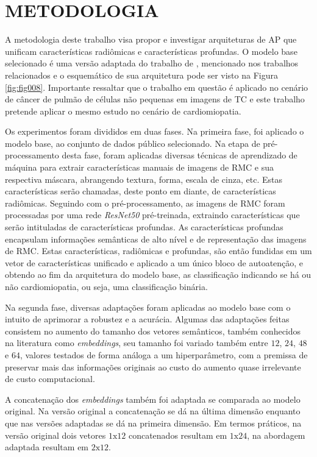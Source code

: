 \chapter{METODOLOGIA} 
\label{chap:metodologia}

A metodologia deste trabalho visa propor e investigar arquiteturas de \gls{AP} que unificam características radiômicas e características profundas. O modelo base selecionado é uma versão adaptada do trabalho de \cite{aiSelfAttentionBasedFusion2023}, mencionado nos trabalhos relacionados e o esquemático de sua arquitetura pode ser visto na Figura \ref{fig:fig008}. Importante ressaltar que o trabalho em questão é aplicado no cenário de câncer de pulmão de células não pequenas em imagens de \gls{TC} e este trabalho pretende aplicar o mesmo estudo no cenário de cardiomiopatia.

 Os experimentos foram divididos em duas fases. Na primeira fase, foi aplicado o modelo base, ao conjunto de dados público selecionado. Na etapa de pré-processamento desta fase, foram aplicadas diversas técnicas de aprendizado de máquina para extrair características manuais de imagens de \gls{RMC} e sua respectiva máscara, abrangendo textura, forma, escala de cinza, etc. Estas características serão chamadas, deste ponto em diante, de características radiômicas. Seguindo com o pré-processamento, as imagens de \gls{RMC} foram processadas por uma rede \textit{ResNet50} pré-treinada, extraindo características que serão intituladas de características profundas. As características profundas encapsulam informações semânticas de alto nível e de representação das imagens de \gls{RMC}. Estas características, radiômicas e profundas, são então fundidas em um vetor de características unificado e aplicado a um único bloco de autoatenção, e obtendo ao fim da arquitetura do modelo base, as classificação indicando se há ou não cardiomiopatia, ou seja, uma classificação binária.

Na segunda fase, diversas adaptações foram aplicadas ao modelo base com o intuito de aprimorar a robustez e a acurácia. Algumas das adaptações feitas consistem no aumento do tamanho dos vetores semânticos, também conhecidos na literatura como \textit{embeddings}, seu tamanho foi variado também entre $12$, $24$, $48$ e $64$, valores testados de forma análoga a um hiperparâmetro, com a premissa de preservar mais das informações originais ao custo do aumento quase irrelevante de custo computacional.

A concatenação dos \textit{embeddings} também foi adaptada se comparada ao modelo original. Na versão original a concatenação se dá na última dimensão enquanto que nas versões adaptadas se dá na primeira dimensão. Em termos práticos, na versão original dois vetores $1\text{x}12$ concatenados resultam em $1\text{x}24$, na abordagem adaptada resultam em $2\text{x}12$. 

